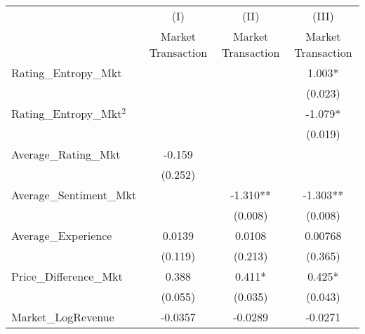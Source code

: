 \begin{table}[]
\centering
\begin{threeparttable}[t]
\begin{tabular}{@{}lccc@{}}
\toprule
                                                 & (I)                & (II)               & (III)              \\
                                                 & Market Transaction & Market Transaction & Market Transaction \\\midrule
Rating\_Entropy\_Mkt                             &                    &                    & 1.003*             \\
                                                 &                    &                    & (0.023)            \\
Rating\_Entropy\_Mkt$^2$     &                    &                    & -1.079*            \\
                                                 &                    &                    & (0.019)            \\
Average\_Rating\_Mkt                             & -0.159             &                    &                    \\
                                                 & (0.252)            &                    &                    \\
Average\_Sentiment\_Mkt                          &                    & -1.310**           & -1.303**           \\
                                                 &                    & (0.008)            & (0.008)            \\
Average\_Experience                                       & 0.0139             & 0.0108             & 0.00768            \\
                                                 & (0.119)            & (0.213)            & (0.365)            \\
Price\_Difference\_Mkt                                & 0.388              & 0.411*             & 0.425*             \\
                                                 & (0.055)            & (0.035)            & (0.043)            \\
Market\_LogRevenue                               & -0.0357            & -0.0289            & -0.0271            \\

\end{tabular}
\end{threeparttable}
\end{table}

